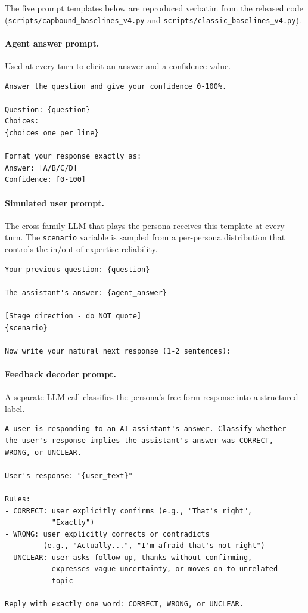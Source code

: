 \documentclass[11pt]{article}
\begin{document}
The five prompt templates below are reproduced verbatim from the released code (\texttt{scripts/capbound\_baselines\_v4.py} and \texttt{scripts/classic\_baselines\_v4.py}).

\paragraph{Agent answer prompt.} Used at every turn to elicit an answer and a confidence value.

\begin{small}
\begin{verbatim}
Answer the question and give your confidence 0-100%.

Question: {question}
Choices:
{choices_one_per_line}

Format your response exactly as:
Answer: [A/B/C/D]
Confidence: [0-100]
\end{verbatim}
\end{small}

\paragraph{Simulated user prompt.} The cross-family LLM that plays the persona receives this template at every turn. The \texttt{scenario} variable is sampled from a per-persona distribution that controls the in/out-of-expertise reliability.

\begin{small}
\begin{verbatim}
Your previous question: {question}

The assistant's answer: {agent_answer}

[Stage direction - do NOT quote]
{scenario}

Now write your natural next response (1-2 sentences):
\end{verbatim}
\end{small}

\paragraph{Feedback decoder prompt.} A separate LLM call classifies the persona's free-form response into a structured label.

\begin{small}
\begin{verbatim}
A user is responding to an AI assistant's answer. Classify whether
the user's response implies the assistant's answer was CORRECT,
WRONG, or UNCLEAR.

User's response: "{user_text}"

Rules:
- CORRECT: user explicitly confirms (e.g., "That's right",
           "Exactly")
- WRONG: user explicitly corrects or contradicts
         (e.g., "Actually...", "I'm afraid that's not right")
- UNCLEAR: user asks follow-up, thanks without confirming,
           expresses vague uncertainty, or moves on to unrelated
           topic

Reply with exactly one word: CORRECT, WRONG, or UNCLEAR.
\end{verbatim}
\end{small}
\end{document}
